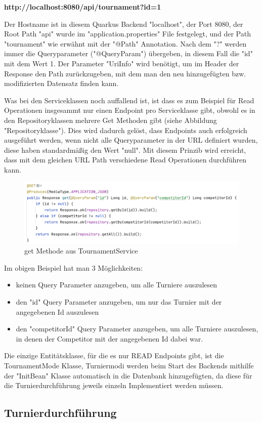 \textbf{http://localhost:8080/api/tournament?id=1} 

Der Hostname ist in diesem Quarkus Backend "localhost", der Port 8080, der Root Path "api" wurde im "application.properties" File festgelegt, und der Path "tournament" wie erwähnt mit der "@Path" Annotation. 
Nach dem "?" werden immer die Queryparameter ("@QueryParam") übergeben, in diesem Fall die "id" mit dem Wert 1. Der Parameter "UriInfo" wird benötigt, um im Header der Response den Path zurückzugeben, 
mit dem man den neu hinzugefügten bzw. modifizierten Datensatz finden kann.

Was bei den Serviceklassen noch auffallend ist, ist dass es zum Beispiel für Read Operationen insgesammt nur einen Endpoint pro Serviceklasse gibt, obwohl es in den Repositoryklassen mehrere Get Methoden gibt (siehe Abbildung "Repositoryklasse").
Dies wird dadurch gelöst, dass Endpoints auch erfolgreich ausgeführt werden, wenn nicht alle Queryparameter in der URL definiert wurden, diese haben standardmäßig den Wert "null". Mit diesem Prinzib wird erreicht, dass mit dem gleichen URL Path 
verschiedene Read Operationen durchführen kann.

\begin{figure}[H]
    \includegraphics[scale=0.5]{pics/service_get_function.png}
    \caption{get Methode aus TournamentService}
\end{figure}

Im obigen Beispiel hat man 3 Möglichkeiten:

\begin{itemize}
    \item keinen Query Parameter anzugeben, um alle Turniere auszulesen
    \item den "id" Query Parameter anzugeben, um nur das Turnier mit der angegebenen Id auszulesen
    \item den "competitorId" Query Parameter anzugeben, um alle Turniere auszulesen, in denen der Competitor mit der angegebenen Id dabei war.
\end{itemize}


Die einzige Entitätsklasse, für die es nur READ Endpoints gibt, ist die TournamentMode Klasse, Turniermodi werden beim Start des Backends mithilfe der "InitBean" Klasse 
automatisch in die Datenbank hinzugefügten, da diese für die Turnierdurchführung jeweils einzeln Implementiert werden müssen.

\subsection{Turnierdurchführung}


